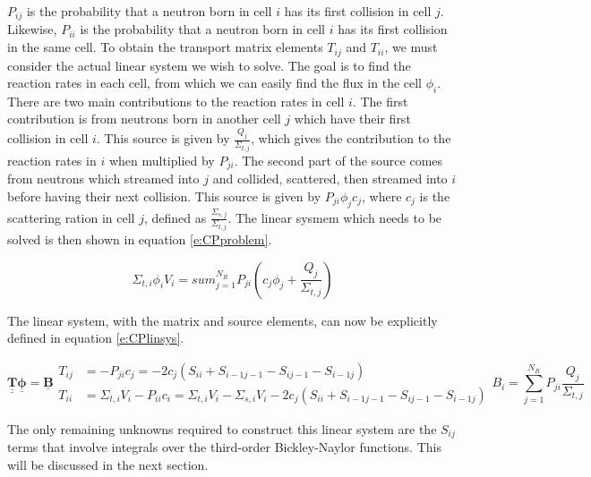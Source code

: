 $P_{ij}$ is the probability that a neutron born in cell $i$ has its first collision in cell $j$.  Likewise, $P_{ii}$ is the probability that a neutron born in cell $i$ has its first collision in the same cell.  To obtain the transport matrix elements $T_{ij}$ and $T_{ii}$, we must consider the actual linear system we wish to solve.  The goal is to find the reaction rates in each cell, from which we can easily find the flux in the cell $\phi_i$.  There are two main contributions to the reaction rates in cell $i$.  The first contribution is from neutrons born in another cell $j$ which have their first collision in cell $i$.  This source is given by $\frac{Q_j}{\Sigma_{t,j}}$, which gives the contribution to the reaction rates in $i$ when multiplied by $P_{ji}$.  The second part of the source comes from neutrons which streamed into $j$ and collided, scattered, then streamed into $i$ before having their next collision.  This source is given by $P_{ji} \phi_j c_j$, where $c_j$ is the scattering ration in cell $j$, defined as $\frac{\Sigma_{s,j}}{\Sigma_{t,j}}$.  The linear sysmem which needs to be solved is then shown in equation \ref{e:CPproblem}.

\begin{equation}\label{e:CPproblem}
\Sigma_{t,i} \phi_i V_i = sum_{j=1}^{N_R} P_{ji}\left(c_j\phi_j + \frac{Q_j}{\Sigma_{t,j}}\right)
\end{equation}

The linear system, with the matrix and source elements, can now be explicitly defined in equation \ref{e:CPlinsys}.

\begin{subequations}\label{e:CPlinsys}
  \begin{equation}
  \underline{\underline{\bm T}}\underline{\bm\phi} = \underline{\bm B}
  \end{equation}
  \begin{align}
  T_{ij} &= -P_{ji} c_j = -2 c_j \left(S_{ii} + S_{i-1j-1} - S_{ij-1} - S_{i-1j}\right) \\
  T_{ii} &= \Sigma_{t,i} V_i - P_{ii} c_i = \Sigma_{t,i} V_i - \Sigma_{s,i} V_i - 2 c_j \left(S_{ii} + S_{i-1j-1} - S_{ij-1} - S_{i-1j}\right)
  \end{align}
  \begin{equation}
  B_i =\sum_{j=1}^{N_R} P_{ji} \frac{Q_j}{\Sigma_{t,j}}
  \end{equation}
\end{subequations}

The only remaining unknowns required to construct this linear system are the $S_{ij}$ terms that involve integrals over the third-order Bickley-Naylor functions.  This will be discussed in the next section.


